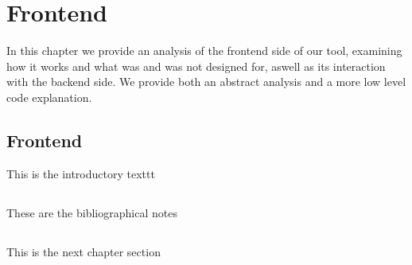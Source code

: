 %
%

\chapter{Frontend}

\begin{resumen}
In this chapter we provide an analysis of the frontend side of our tool, examining how it works and what was and was not designed for, aswell as its interaction with the backend side.
We provide both an abstract analysis and a more low level code explanation.
\end{resumen}


\section{Frontend}
\label{cap1:sec:introduccion}

This is the introductory texttt

\section*{\NotasBibliograficas}
\TocNotasBibliograficas

These are the bibliographical notes
\citep{ldesc2e}

\medskip



\section*{\ProximoCapitulo}
\TocProximoCapitulo

This is the next chapter section

